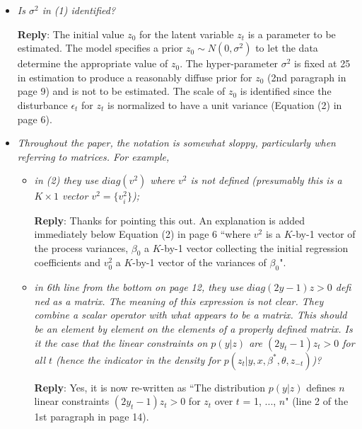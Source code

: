 \documentclass[12pt]{article}
\begin{document}
\begin{itemize}
\item \textit{Is $\sigma^2$ in (1) identified?}

\textbf{Reply}: The initial value $z_0$ for the latent variable $z_t$ is a parameter to be estimated. The model specifies a prior $z_0 \sim N(0,\sigma^2)$ to let the data determine the appropriate value of $z_0$. The hyper-parameter $\sigma^2$ is fixed at 25 in estimation to produce a reasonably diffuse prior for $z_0$ (2nd paragraph in page 9) and is not to be estimated. The scale of $z_0$ is identified since the disturbance $\epsilon_t$ for $z_t$ is normalized to have a unit variance (Equation (2) in page 6). 



\item \textit{Throughout the paper, the notation is somewhat sloppy, particularly when
referring to matrices. For example,}
\begin{itemize}
\item \textit{in (2) they use $diag(v^2)$ where $v^2$ is not defined (presumably this is a $K \times 1$ vector $v^2=\{v_i^2\}$);}

\textbf{Reply}: Thanks for pointing this out. An explanation is added immediately below Equation (2) in page 6 ``where $v^2$ is a $K$-by-1 vector of the process variances, $\beta_0$ a $K$-by-1 vector collecting the initial regression coefficients and $v_0^2$ a $K$-by-1 vector of the variances of $\beta_0$". 

\item \textit{in 6th line from the bottom on page 12, they use $diag(2y-1)z>0$ defined as a matrix. The meaning of this expression is not clear. They combine a scalar operator with what appears to be a matrix. This should be an element by element on the elements of a properly defined matrix. Is it the case that the linear constraints on $p(y|z)$ are $(2y_t-1) z_t > 0$ for all $t$ (hence the indicator in the density for $p(z_t|y, x, \beta^*, \theta, z_{-t})$)?}

\textbf{Reply}: Yes, it is now re-written as ``The distribution $p(y|z)$ defines $n$ linear constraints $(2 y_t - 1) z_t > 0$ for $z_t$ over $t$ = 1, ..., $n$" (line 2 of the 1st paragraph in page 14). 

\end{itemize}


\end{itemize}
\end{document}
